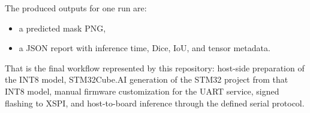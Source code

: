 \documentclass[11pt,a4paper]{article}
\begin{document}
The produced outputs for one run are:

\begin{itemize}
\item a predicted mask PNG,
\item a JSON report with inference time, Dice, IoU, and tensor metadata.
\end{itemize}

That is the final workflow represented by this repository: host-side preparation of the
INT8 model, STM32Cube.AI generation of the STM32 project from that INT8 model, manual
firmware customization for the UART service, signed flashing to XSPI, and host-to-board
inference through the defined serial protocol.
\end{document}
